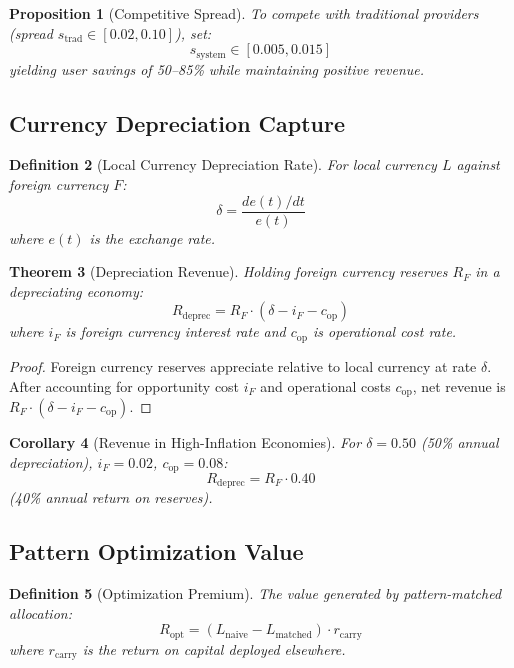 \documentclass[12pt]{article}
\newtheorem{theorem}{Theorem}
\newtheorem{definition}[theorem]{Definition}
\newtheorem{proposition}[theorem]{Proposition}
\newtheorem{corollary}[theorem]{Corollary}
\begin{document}
\begin{proposition}[Competitive Spread]
To compete with traditional providers (spread $s_{\text{trad}} \in [0.02, 0.10]$), set:
$$
s_{\text{system}} \in [0.005, 0.015]
$$
yielding user savings of 50--85\% while maintaining positive revenue.
\end{proposition}

\subsection{Currency Depreciation Capture}

\begin{definition}[Local Currency Depreciation Rate]
For local currency $L$ against foreign currency $F$:
$$
\delta = \frac{de(t)/dt}{e(t)}
$$
where $e(t)$ is the exchange rate.
\end{definition}

\begin{theorem}[Depreciation Revenue]
Holding foreign currency reserves $R_F$ in a depreciating economy:
$$
R_{\text{deprec}} = R_F \cdot (\delta - i_F - c_{\text{op}})
$$
where $i_F$ is foreign currency interest rate and $c_{\text{op}}$ is operational cost rate.
\end{theorem}

\begin{proof}
Foreign currency reserves appreciate relative to local currency at rate $\delta$. After accounting for opportunity cost $i_F$ and operational costs $c_{\text{op}}$, net revenue is $R_F \cdot (\delta - i_F - c_{\text{op}})$.
\end{proof}

\begin{corollary}[Revenue in High-Inflation Economies]
For $\delta = 0.50$ (50\% annual depreciation), $i_F = 0.02$, $c_{\text{op}} = 0.08$:
$$
R_{\text{deprec}} = R_F \cdot 0.40
$$
(40\% annual return on reserves).
\end{corollary}

\subsection{Pattern Optimization Value}

\begin{definition}[Optimization Premium]
The value generated by pattern-matched allocation:
$$
R_{\text{opt}} = (L_{\text{naive}} - L_{\text{matched}}) \cdot r_{\text{carry}}
$$
where $r_{\text{carry}}$ is the return on capital deployed elsewhere.
\end{definition}
\end{document}
